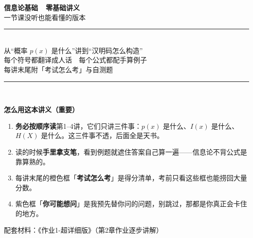 \documentclass[11pt,a4paper]{ctexart}
\begin{document}
\begin{titlepage}
\centering
\vspace*{2.0cm}
{\Huge\bfseries\color{acc1} 信息论基础\ \ 零基础讲义}\\[1.0em]
{\Large 一节课没听也能看懂的版本}\\[2.5em]
\rule{0.7\textwidth}{0.8pt}\\[1.5em]
{\large 从“概率 $p(x)$ 是什么”讲到“汉明码怎么构造”}\\[0.5em]
{\large 每个符号都翻译成人话\ \textbullet\ 每个公式都配手算例子}\\[0.5em]
{\large 每讲末尾附「考试怎么考」与自测题}\\[1.5em]
\rule{0.7\textwidth}{0.8pt}\\[3.5em]
\begin{minipage}{0.86\textwidth}
\begin{tcolorbox}[colback=soft,colframe=acc1,boxrule=0.7pt,arc=2pt]
\textbf{怎么用这本讲义（重要）}\\[4pt]
\begin{enumerate}[leftmargin=1.5em,itemsep=2pt,topsep=2pt]
  \item \textbf{务必按顺序读}第1--4讲，它们只讲三件事：$p(x)$ 是什么、$I(x)$ 是什么、$H(X)$ 是什么。这三件事不透，后面全是天书。
  \item 读的时候\textbf{手里拿支笔}，看到例题就遮住答案自己算一遍——信息论不背公式是靠算熟的。
  \item 每讲末尾的橙色框「\textbf{考试怎么考}」是得分清单，考前只看这些框也能捞回大量分数。
  \item 紫色框「\textbf{你可能想问}」是我预先替你问的问题，别跳过，那都是你真正会卡住的地方。
\end{enumerate}
\end{tcolorbox}
\end{minipage}
\vfill
{\large 配套材料：《作业1-超详细版》（第2章作业逐步讲解）}\\[3cm]
\end{titlepage}

\tableofcontents
\newpage


\clearpage

\clearpage

\clearpage

\clearpage

\clearpage

\clearpage

\clearpage

\clearpage

\clearpage

\end{document}
